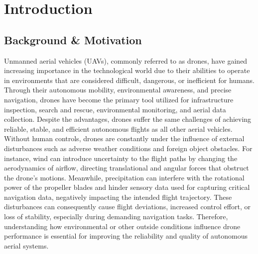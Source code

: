 \documentclass[12pt,letterpaper]{article}
\begin{document}
\section{Introduction}
\subsection{Background \& Motivation}
Unmanned aerial vehicles (UAVs), commonly referred to as drones, have gained increasing importance in the technological world due to their abilities to operate in environments that are considered difficult, dangerous, or inefficient for humans. Through their autonomous mobility, environmental awareness, and precise navigation, drones have become the primary tool utilized for infrastructure inspection, search and rescue, environmental monitoring, and aerial data collection. Despite the advantages, drones suffer the same challenges of achieving reliable, stable, and efficient autonomous flights as all other aerial vehicles. Without human controls, drones are constantly under the influence of external disturbances such as adverse weather conditions and foreign object obstacles. For instance, wind can introduce uncertainty to the flight paths by changing the aerodynamics of airflow, directing translational and angular forces that obstruct the drone’s motions. Meanwhile, precipitation can interfere with the rotational power of the propeller blades and hinder sensory data used for capturing critical navigation data, negatively impacting the intended flight trajectory. These disturbances can consequently cause flight deviations, increased control effort, or loss of stability, especially during demanding navigation tasks. Therefore, understanding how environmental or other outside conditions influence drone performance is essential for improving the reliability and quality of autonomous aerial systems.
\end{document}
